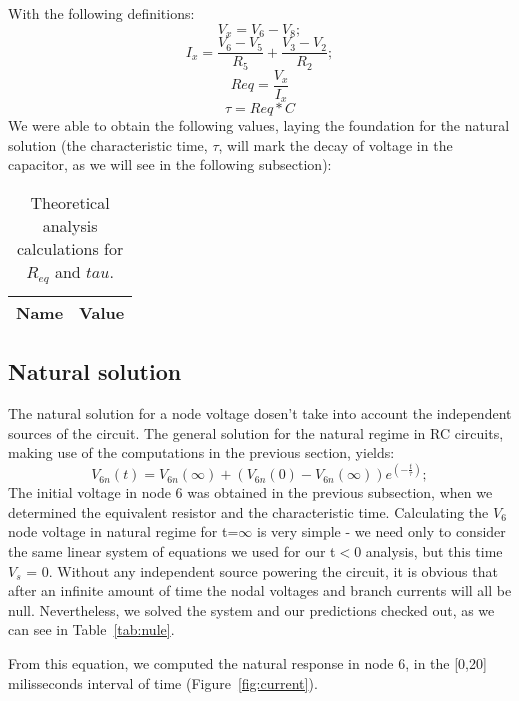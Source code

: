 With the following definitions:
\begin{equation}
V_x=V_6-V_8;
\end{equation}
\begin{equation}
I_x=\frac {V_6-V_5}{R_5}+\frac {V_3-V_2}{R_2};
\end{equation}
\begin{equation}
Req=\frac {V_x}{I_x}
\end{equation}
\begin{equation}
\tau=Req*C
\end{equation}
We were able to obtain the following values, laying the foundation for the natural solution (the characteristic time, $\tau$, will mark the decay of voltage in the capacitor, as we will see in the following subsection):
\begin{table}[h]
  \centering
  \begin{tabular}{|l|r|}
    \hline    
    {\bf Name} & {\bf Value} \\ \hline
     
  \end{tabular}
  \caption{Theoretical analysis calculations for $R_{eq}$ and $tau$.}
  \label{tab:equivalent}
\end{table}
\subsection{Natural solution}
The natural solution for a node voltage dosen't take into account the independent sources of the circuit. The general solution for the natural regime in RC circuits, making use of the computations in the previous section, yields:
\begin{equation}
V_{6n}(t)=V_{6n}(\infty) + (V_{6n}(0) - V_{6n}(\infty))e^{(-\frac{t}{\tau})};
\end{equation}
The initial voltage in node 6 was obtained in the previous subsection, when we determined the equivalent resistor and the characteristic time. Calculating the $V_{6}$ node voltage in natural regime for t=$\infty$ is very simple - we need only to consider the same linear system of equations we used for our t$<$0 analysis, but this time $V_{s}$ = 0. Without any independent source powering the circuit, it is obvious that after an infinite amount of time the nodal voltages and branch currents will all be null. Nevertheless, we solved the system and our predictions checked out, as we can see in Table~\ref{tab:nule}.

From this equation, we computed the natural response in node 6, in the [0,20] milisseconds interval of time (Figure~\ref{fig:current}).

